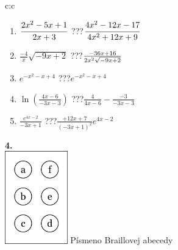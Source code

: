 \documentclass[10pt]{report}
\begin{document}
\begin{tabular}{c:c}
\begin{minipage}[c][104.5mm][t]{0.5\linewidth}
\begin{center}
\begin{minipage}{0.79\linewidth}
\begin{center}
\begin{varwidth}{\linewidth}
\begin{enumerate}
\item $\cfrac{2x^2-5x+1}{2x+3}$\quad \dotfill\; ???\;\dotfill \quad $\cfrac{4x^2-12x-17}{4x^2+12x+9}$
\item $\frac{-4}{x}\sqrt{-9x+2}$\quad \dotfill\; ???\;\dotfill \quad $\frac{-36x+16}{2x^2 \sqrt{\smash[b]{-9x+2}}}$
\item $e^{-x^2-x+4}$\quad \dotfill\; ???\;\dotfill \quad $e^{-x^2-x+4}$
\item $\ln{\left(\frac{4x-6}{-3x-3}\right)}$\quad \dotfill\; ???\;\dotfill \quad $\frac{4}{4x-6}-\frac{-3}{-3x-3}$
\item $\frac{e^{4x-2}}{-3x+1}$\quad \dotfill\; ???\;\dotfill \quad $\frac{+12x+7}{(-3x+1)^2}e^{4x-2}$
\end{enumerate}
\end{varwidth}
\end{center}
\end{minipage}
\begin{minipage}{0.20\linewidth}
\begin{center}
{\Huge\bfseries 4.} \\[2mm]
\includegraphics[height=40mm]{../images/braille.png}
{\small Písmeno Braillovej abecedy}
\end{center}
\end{minipage}
\end{center}
\end{minipage}
%
\end{tabular}
\newpage
\end{document}
